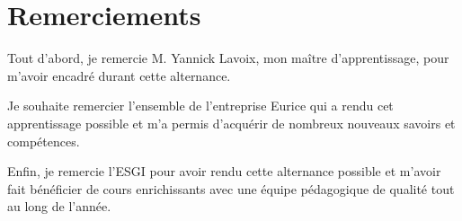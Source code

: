 \documentclass[11pt]{report}
\begin{document}
    \chapter*{Remerciements}
    Tout d’abord, je remercie M. Yannick Lavoix, mon maître d’apprentissage,
    pour m’avoir encadré durant cette alternance. 
    
    
    Je souhaite remercier l’ensemble de l’entreprise Eurice qui a
    rendu cet apprentissage possible et m’a permis d’acquérir de nombreux nouveaux
    savoirs et compétences.\newline
    
    Enfin, je remercie l'ESGI pour avoir rendu
    cette alternance possible et m’avoir fait bénéficier de cours enrichissants avec
    une équipe pédagogique de qualité tout au long de l’année. \newline

    \renewcommand{\baselinestretch}{1.30}\small \normalsize
    \tableofcontents
    \renewcommand{\baselinestretch}{1.18}\small \normalsize
    
    
    
    
    
    
    \printglossaries
    
    
    
\end{document}
